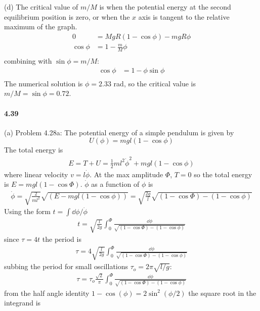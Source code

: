 \documentclass[../problems.tex]{subfiles}
\begin{document}
(d) The critical value of $m/M$ is when the potential energy at the second equilibrium position is
zero, or when the $x$ axis is tangent to the relative maximum of the graph.
\begin{align*}
    0 &= MgR(1 - \cos\phi) - mgR\phi \\
    \cos\phi &= 1 - \frac{m}{M} \phi \\
\end{align*}
combining with $\sin\phi = m/M$:
\begin{align*}
    \cos\phi &= 1 - \phi \sin\phi \\
\end{align*}
The numerical solution is $\phi = 2.33$ rad, so the critical value is $m/M = \sin\phi = 0.72$.

\paragraph{4.39}
(a) Problem 4.28a: The potential energy of a simple pendulum is given by
\begin{equation*}
    U(\phi) = mgl(1 - \cos\phi)
\end{equation*}
The total energy is
\begin{align*}
    E = T + U = \frac{1}{2} ml^2 \dot{\phi}^2 + mgl(1 - \cos\phi)
\end{align*}
where linear velocity $v = l\dot{\phi}$. At the max amplitude $\Phi$, $T = 0$ so the total energy is 
$E = mgl(1 - \cos\Phi)$. $\dot\phi$ as a function of $\phi$ is
\begin{align*}
    \dot{\phi} = \sqrt{\frac{2}{ml^2}} \sqrt{(E - mgl(1 - \cos\phi))}
    = \sqrt{\frac{2g}{l}} \sqrt{(1-\cos\Phi) - (1-\cos\phi)}
\end{align*}
Using the form $t = \int \dd{\phi}/ \dot{\phi}$
\begin{align*}
    t = \sqrt{\frac{l}{2g}} \int_0^\Phi \frac{\dd{\phi}}{\sqrt{(1-\cos\Phi) - (1 - \cos\phi)}}
\end{align*}
since $\tau = 4t$ the period is
\begin{align*}
    \tau = 4 \sqrt{\frac{l}{2g}} \int_0^\Phi \frac{\dd{\phi}}{\sqrt{(1-\cos\Phi) - (1-\cos\phi)}}
\end{align*}
subbing the period for small oscillations $\tau_o = 2\pi \sqrt{l/g}$:
\begin{align*}
    \tau = \tau_o \frac{\sqrt{2}}{\pi} \int_0^\Phi
        \frac{\dd{\phi}}{\sqrt{(1-\cos\Phi) - (1-\cos\phi)}}
\end{align*}
from the half angle identity $1 - \cos(\phi) = 2 \sin^2(\phi/2)$ the square root in the integrand is
\end{document}
